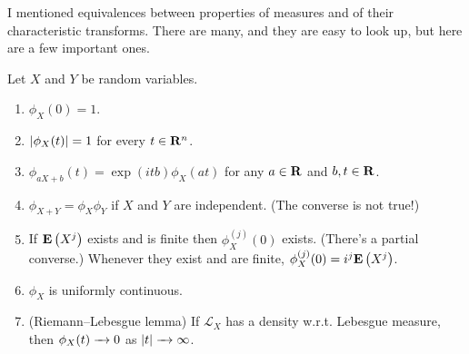 \documentclass[11pt,letterpaper,reqno,oneside]{article}
\begin{document}
I mentioned equivalences between properties of measures and of their characteristic transforms. There are many, and they are easy to look up, but here are a few important ones.
%
\begin{proposition}
	\label{proposition:characteristic_fn_properties}
	Let $X$ and $Y$ be random variables.
	\begin{enumerate}

		\item $\phi_X(0)=1$.

		\item $\abs*{\phi_X(t)}=1$ for every $t \in \R^n$.

		\item $\phi_{aX+b}(t) = \exp(itb) \phi_X(at)$ for any $a \in \R$ and $b,t \in \R$.

		\item $\phi_{X+Y} = \phi_X \phi_Y$ if $X$ and $Y$ are independent. (The converse is not true!)

		\item If $\E\left(X^j\right)$ exists and is finite then $\phi_X^{(j)}(0)$ exists. (There's a partial converse.) Whenever they exist and are finite, $\phi_X^{(j)}(0) = i^j \E\left(X^j\right)$.

		\item $\phi_X$ is uniformly continuous.

		\item (Riemann--Lebesgue lemma) If $\mathcal{L}_X$ has a density w.r.t. Lebesgue measure, then $\phi_X(t) \conv 0$ as $\abs{t} \conv \infty$.

	\end{enumerate}
\end{proposition}
%
\end{document}
